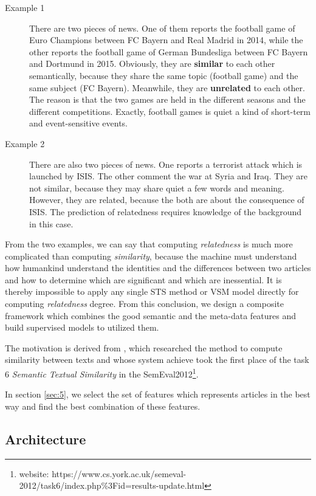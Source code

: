 \begin{description}

\item[Example 1] There are two pieces of news. One of them reports the football game of Euro Champions between FC Bayern and Real Madrid in 2014, while the other reports the football game of German Bundesliga between FC Bayern and Dortmund in 2015. Obviously, they are \textbf{similar} to each other semantically, because they share the same topic (football game) and the same subject (FC Bayern). Meanwhile, they are \textbf{unrelated} to each other. The reason is that the two games are held in the different seasons and the different competitions. Exactly, football games is quiet a kind of short-term and event-sensitive events. 

\item[Example 2] There are also two pieces of news. One reports a terrorist attack which is launched by ISIS. The other comment the war at Syria and Iraq. They are not similar, because they may share quiet a few words and meaning. However, they are related, because the both are about the consequence of ISIS. The prediction of relatedness requires knowledge of the background in this case. 

\end{description}

From the two examples, we can say that computing \textit{relatedness} is much more complicated than computing \textit{similarity}, because the machine must understand how humankind understand the identities and the differences between two articles and how to determine which are significant and which are inessential. It is thereby impossible to apply any single STS method or VSM model directly for computing \textit{relatedness} degree. From this conclusion, we design a composite framework which combines the good semantic and the meta-data features and build supervised models to utilized them. 

The motivation is derived from \cite{bar2013composite}, which researched the method to compute similarity between texts and whose system achieve took the first place of the task 6 \textit{Semantic Textual Similarity} in the SemEval2012\footnote{website: https://www.cs.york.ac.uk/semeval-2012/task6/index.php\%3Fid=results-update.html}. 

In section \ref{sec:5}, we select the set of features which represents articles in the best way and find the best combination of these features. 

\subsection{Architecture}
\label{sec:4.2}


